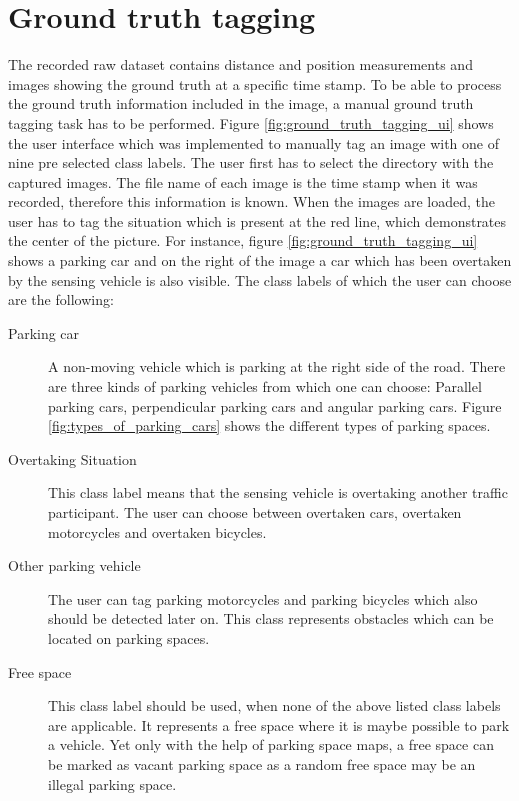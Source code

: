 \section{Ground truth tagging}

The recorded raw dataset contains distance and position measurements and images showing the ground truth at a specific time stamp. To be able to process the ground truth information included in the image, a manual ground truth tagging task has to be performed. Figure \ref{fig:ground_truth_tagging_ui} shows the user interface which was implemented to manually tag an image with one of nine pre selected class labels. The user first has to select the directory with the captured images. The file name of each image is the time stamp when it was recorded, therefore this information is known. When the images are loaded, the user has to tag the situation which is present at the red line, which demonstrates the center of the picture. For instance, figure \ref{fig:ground_truth_tagging_ui} shows a parking car and on the right of the image a car which has been overtaken by the sensing vehicle is also visible.
The class labels of which the user can choose are the following:

\begin{description}

\item[Parking car] A non-moving vehicle which is parking at the right side of the road. There are three kinds of parking vehicles from which one can choose: Parallel parking cars, perpendicular parking cars and angular parking cars. Figure \ref{fig:types_of_parking_cars} shows the different types of parking spaces.

\item[Overtaking Situation] This class label means that the sensing vehicle is overtaking another traffic participant. The user can choose between overtaken cars, overtaken motorcycles and overtaken bicycles.

\item[Other parking vehicle] The user can tag parking motorcycles and parking bicycles which also should be detected later on. This class represents obstacles which can be located on parking spaces.

\item[Free space] This class label should be used, when none of the above listed class labels are applicable. It represents a free space where it is maybe possible to park a vehicle. Yet only with the help of parking space maps, a free space can be marked as vacant parking space as a random free space may be an illegal parking space.

\end{description}



